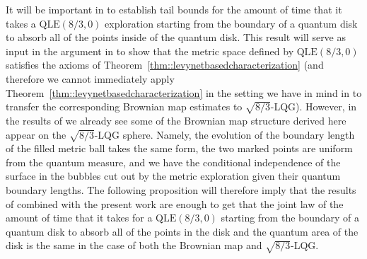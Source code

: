 \documentclass[10pt]{amsart}
\theoremstyle{plain}
\numberwithin{theorem}{section}
\theoremstyle{definition}
\newcommand{\QLE}{\mathrm{QLE}}
\begin{document}
It will be important in \cite{qle_continuity} to establish tail bounds for the amount of time that it takes a $\QLE(8/3,0)$ exploration starting from the boundary of a quantum disk to absorb all of the points inside of the quantum disk. This result will serve as input in the argument in \cite{qle_continuity} to show that the metric space defined by $\QLE(8/3,0)$ satisfies the axioms of Theorem~\ref{thm::levynetbasedcharacterization} (and therefore we cannot immediately apply Theorem~\ref{thm::levynetbasedcharacterization} in the setting we have in mind in \cite{qle_continuity} to transfer the corresponding Brownian map estimates to $\sqrt{8/3}$-LQG). However, in the results of \cite{qlebm} we already see some of the Brownian map structure derived here appear on the $\sqrt{8/3}$-LQG sphere. Namely, the evolution of the boundary length of the filled metric ball takes the same form, the two marked points are uniform from the quantum measure, and we have the conditional independence of the surface in the bubbles cut out by the metric exploration given their quantum boundary lengths. The following proposition will therefore imply that the results of \cite{qlebm} combined with the present work are enough to get that the joint law of the amount of time that it takes for a $\QLE(8/3,0)$ starting from the boundary of a quantum disk to absorb all of the points in the disk and the quantum area of the disk is the same in the case of both the Brownian map and $\sqrt{8/3}$-LQG.
\end{document}
